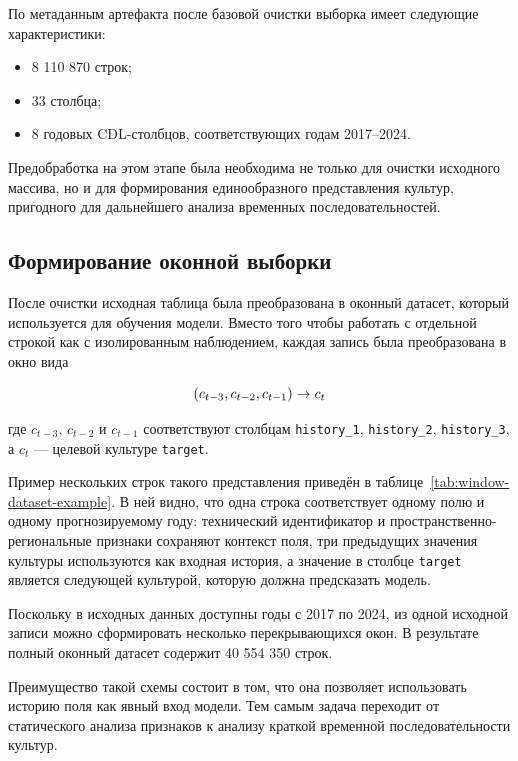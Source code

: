 По метаданным артефакта после базовой очистки выборка имеет следующие характеристики:

\begin{itemize}
\tightlist
\item
  8 110 870 строк;
\item
  33 столбца;
\item
  8 годовых CDL-столбцов, соответствующих годам 2017--2024.
\end{itemize}

Предобработка на этом этапе была необходима не только для очистки исходного массива, но и для формирования
единообразного представления культур, пригодного для дальнейшего анализа временных последовательностей.

\subsection{Формирование оконной выборки}

После очистки исходная таблица была преобразована в оконный датасет, который используется для обучения модели. Вместо
того чтобы работать с отдельной строкой как с изолированным наблюдением, каждая запись была преобразована в окно вида

\begin{equation}
\notag
(c_{t-3}, c_{t-2}, c_{t-1}) \rightarrow c_t
\end{equation}

где \(c_{t-3}\), \(c_{t-2}\) и \(c_{t-1}\) соответствуют столбцам \texttt{history\_1}, \texttt{history\_2}, \texttt{history\_3}, а \(c_t\) --- целевой культуре \texttt{target}.

Пример нескольких строк такого представления приведён в таблице~\ref{tab:window-dataset-example}. В ней видно, что
одна строка соответствует одному полю и одному прогнозируемому году: технический идентификатор и
пространственно-региональные
признаки сохраняют контекст поля, три предыдущих значения культуры используются как входная история, а значение в
столбце \texttt{target} является следующей культурой, которую должна предсказать модель.



Поскольку в исходных данных доступны годы с 2017 по 2024, из одной исходной
записи можно сформировать несколько перекрывающихся окон. В результате полный оконный датасет содержит 40 554 350 строк.

Преимущество такой схемы состоит в том, что она позволяет использовать историю поля как явный вход модели. Тем самым
задача переходит от статического анализа признаков к анализу краткой временной последовательности культур.

